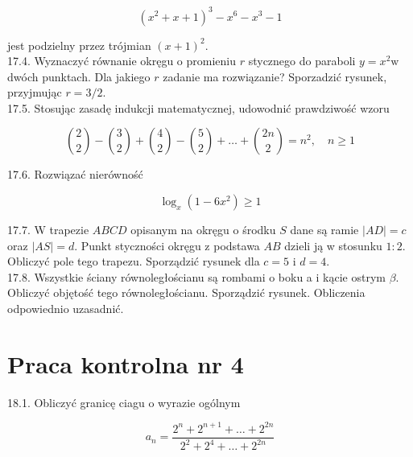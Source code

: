 \documentclass[10pt]{article}
\begin{document}
$$
\left(x^{2}+x+1\right)^{3}-x^{6}-x^{3}-1
$$

jest podzielny przez trójmian $(x+1)^{2}$.\\
17.4. Wyznaczyć równanie okręgu o promieniu $r$ stycznego do paraboli $y=x^{2} \mathrm{w}$ dwóch punktach. Dla jakiego $r$ zadanie ma rozwiązanie? Sporzadzić rysunek, przyjmując $r=3 / 2$.\\
17.5. Stosując zasadę indukcji matematycznej, udowodnić prawdziwość wzoru

$$
\binom{2}{2}-\binom{3}{2}+\binom{4}{2}-\binom{5}{2}+\ldots+\binom{2 n}{2}=n^{2}, \quad n \geq 1
$$

17.6. Rozwiązać nierówność

$$
\log _{x}\left(1-6 x^{2}\right) \geq 1
$$

17.7. W trapezie $A B C D$ opisanym na okręgu o środku $S$ dane są ramie $|A D|=c$ oraz $|A S|=d$. Punkt styczności okręgu z podstawa $A B$ dzieli ją w stosunku $1: 2$. Obliczyć pole tego trapezu. Sporządzić rysunek dla $c=5$ i $d=4$.\\
17.8. Wszystkie ściany równoległościanu są rombami o boku a i kącie ostrym $\beta$. Obliczyć objętość tego równoległościanu. Sporządzić rysunek. Obliczenia odpowiednio uzasadnić.

\section*{Praca kontrolna nr 4}
18.1. Obliczyć granicę ciagu o wyrazie ogólnym

$$
a_{n}=\frac{2^{n}+2^{n+1}+\ldots+2^{2 n}}{2^{2}+2^{4}+\ldots+2^{2 n}}
$$
\end{document}
